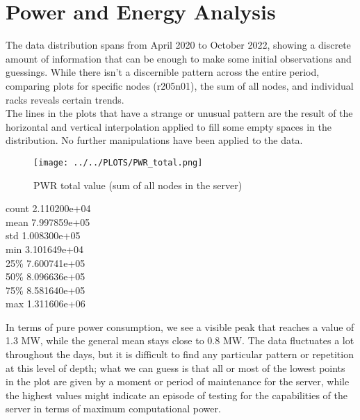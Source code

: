 \section{Power and Energy Analysis}
\noindent
The data distribution spans from April 2020 to October 2022, showing a discrete amount of information that can be enough to make some initial observations and guessings. While there isn't a discernible pattern across the entire period, comparing plots for specific nodes (r205n01), the sum of all nodes, and individual racks reveals certain trends. \\
The lines in the plots that have a strange or unusual pattern are the result of the horizontal and vertical interpolation applied to fill some empty spaces in the distribution. No further manipulations have been applied to the data.

\vspace{-15pt}

\begin{figure}[H]
\centering
\texttt{[image: ../../PLOTS/PWR\_total.png]}
\captionsetup{skip=-10pt}
\caption{PWR total value (sum of all nodes in the server)}
\label{fig:PWR_total}
\end{figure}

\begin{center}
count    2.110200e+04 \\
mean     7.997859e+05 \\
std      1.008300e+05 \\
min      3.101649e+04 \\
25\%      7.600741e+05 \\
50\%      8.096636e+05 \\
75\%      8.581640e+05 \\
max      1.311606e+06
\end{center}

\noindent
In terms of pure power consumption, we see a visible peak that reaches a value of 1.3 MW, while the general mean stays close to 0.8 MW. The data fluctuates a lot throughout the days, but it is difficult to find any particular pattern or repetition at this level of depth; what we can guess is that all or most of the lowest points in the plot are given by a moment or period of maintenance for the server, while the highest values might indicate an episode of testing for the capabilities of the server in terms of maximum computational power.

\vspace{-15pt}

